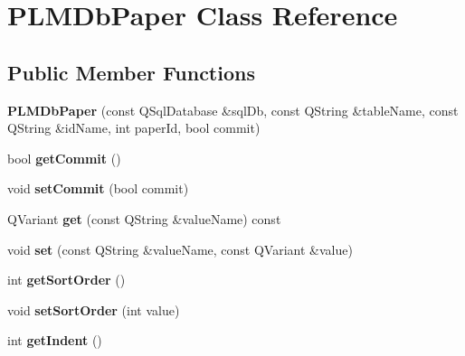 \hypertarget{class_p_l_m_db_paper}{}\section{P\+L\+M\+Db\+Paper Class Reference}
\label{class_p_l_m_db_paper}
\subsection*{Public Member Functions}
\begin{DoxyCompactItemize}
\item 
{\bfseries P\+L\+M\+Db\+Paper} (const Q\+Sql\+Database \&sql\+Db, const Q\+String \&table\+Name, const Q\+String \&id\+Name, int paper\+Id, bool commit)\hypertarget{class_p_l_m_db_paper_ae62948dc66edef1c6dab27a9c480dee7}{}\label{class_p_l_m_db_paper_ae62948dc66edef1c6dab27a9c480dee7}

\item 
bool {\bfseries get\+Commit} ()\hypertarget{class_p_l_m_db_paper_a9c2e66e0003109be3f6b9fabd34d78af}{}\label{class_p_l_m_db_paper_a9c2e66e0003109be3f6b9fabd34d78af}

\item 
void {\bfseries set\+Commit} (bool commit)\hypertarget{class_p_l_m_db_paper_ad76af3948288935278b0ac62f9cbfcb1}{}\label{class_p_l_m_db_paper_ad76af3948288935278b0ac62f9cbfcb1}

\item 
Q\+Variant {\bfseries get} (const Q\+String \&value\+Name) const \hypertarget{class_p_l_m_db_paper_aa33ba73641840a076e0740b561526c3a}{}\label{class_p_l_m_db_paper_aa33ba73641840a076e0740b561526c3a}

\item 
void {\bfseries set} (const Q\+String \&value\+Name, const Q\+Variant \&value)\hypertarget{class_p_l_m_db_paper_aedd3125b90e16706cd955485a1da08ea}{}\label{class_p_l_m_db_paper_aedd3125b90e16706cd955485a1da08ea}

\item 
int {\bfseries get\+Sort\+Order} ()\hypertarget{class_p_l_m_db_paper_a262348110b3a82d1d086a5d963937256}{}\label{class_p_l_m_db_paper_a262348110b3a82d1d086a5d963937256}

\item 
void {\bfseries set\+Sort\+Order} (int value)\hypertarget{class_p_l_m_db_paper_abc5d04213f6dbc76b12390de388c3757}{}\label{class_p_l_m_db_paper_abc5d04213f6dbc76b12390de388c3757}

\item 
int {\bfseries get\+Indent} ()\hypertarget{class_p_l_m_db_paper_a3252c61d00f31e6dae30a167cb03be00}{}\label{class_p_l_m_db_paper_a3252c61d00f31e6dae30a167cb03be00}


\end{DoxyCompactItemize}
